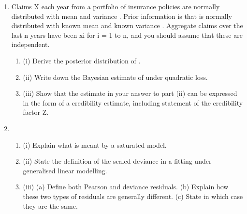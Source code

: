 \documentclass[a4paper,12pt]{article}
\begin{document}
\begin{enumerate}

\item Claims X each year from a portfolio of insurance policies are normally distributed
with mean \theta and variance . Prior information is that \theta is normally distributed with
known mean \mu and known variance .
Aggregate claims over the last n years have been xi for i = 1 to n, and you should
assume that these are independent.
\begin{enumerate}
\item (i) Derive the posterior distribution of \theta. 
\item (ii) Write down the Bayesian estimate of \theta under quadratic loss. 
\item (iii) Show that the estimate in your answer to part (ii) can be expressed in the
form of a credibility estimate, including statement of the credibility factor Z.
\end{enumerate}

\item %

\begin{enumerate}
\item (i) Explain what is meant by a saturated model. 
\item(ii) State the definition of the scaled deviance in a fitting under generalised
linear modelling. 
\item (iii) (a) Define both Pearson and deviance residuals.
(b) Explain how these two types of residuals are generally different.
(c) State in which case they are the same. 
\end{enumerate}
\end{enumerate}
\newpage
\end{document}
